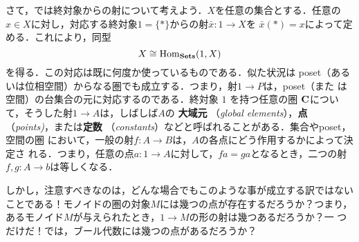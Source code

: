 さて，では終対象からの射について考えよう．$X$を任意の集合とする．任意の
$x \in X$に対し，対応する終対象$1 = \{\ast\}$からの射$\bar x:1 \to X$を
$\bar x(\ast) = x$によって定める．これにより，同型
\[
 X \cong \mathrm{Hom}_{\mathbf{Sets}}(1, X)
\]
を得る．この対応は既に何度か使っているものである．似た状況は poset（ある
いは位相空間）からなる圏でも成立する．つまり，射$1 \to P$は，poset（また
は空間）の台集合の元に対応するのである．終対象 $1$ を持つ任意の圏
${\bf C}$について，そうした射$1 \to A$は，しばしば$A$の
{\bfseries 大域元}
（{\itshape global elements}），{\bfseries 点}
（{\itshape points)}，または{\bfseries 定数}
（{\itshape constants}）などと呼ばれることがある．集合やposet，空間の圏
において，一般の射$f:A \to B$は，$A$の各点にどう作用するかによって決定さ
れる．つまり，任意の点$a:1 \to A$に対して，$fa = ga$となるとき，二つの射
$f, g: A \to  b$は等しくなる．

しかし，注意すべきなのは，どんな場合でもこのような事が成立する訳ではない
ことである！モノイドの圏の対象$M$には幾つの点が存在するだろうか？つまり，
あるモノイド$M$が与えられたとき，$1 \to M$の形の射は幾つあるだろうか？一
つだけだ！では，ブール代数には幾つの点があるだろうか？


